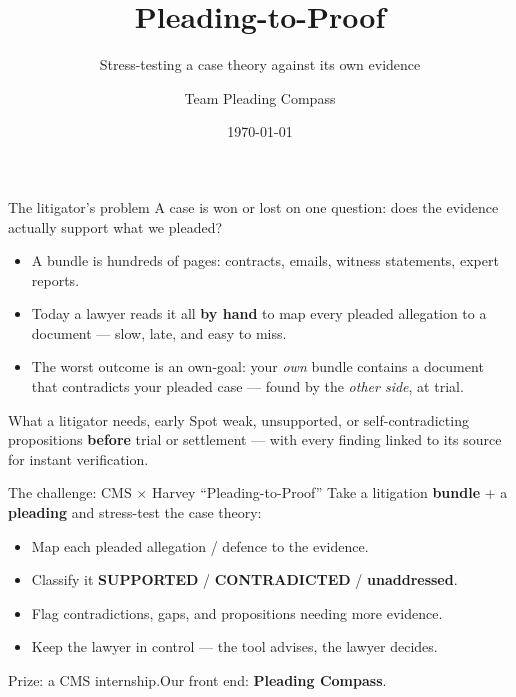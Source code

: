 \documentclass[aspectratio=169,10pt]{beamer}
\title{Pleading-to-Proof}
\subtitle{Stress-testing a case theory against its own evidence}
\author{Team Pleading Compass}
\institute{HackTheLaw 2026 \quad$\cdot$\quad CMS $\times$ Harvey Challenge}
\date{\today}
\newcommand{\supported}{\textcolor{goodgreen}{\textbf{SUPPORTED}}}
\newcommand{\contradicted}{\textcolor{badred}{\textbf{CONTRADICTED}}}
\begin{document}
\maketitle

\begin{frame}{The litigator's problem}
  A case is won or lost on one question: \alert{does the evidence actually
  support what we pleaded?}
  \medskip
  \begin{itemize}
    \item A bundle is hundreds of pages: contracts, emails, witness
          statements, expert reports.
    \item Today a lawyer reads it all \textbf{by hand} to map every pleaded
          allegation to a document --- slow, late, and easy to miss.
    \item The worst outcome is an \alert{own-goal}: your \emph{own} bundle
          contains a document that contradicts your pleaded case --- found by
          the \emph{other side}, at trial.
  \end{itemize}
  \medskip
  \begin{block}{What a litigator needs, early}
    Spot weak, unsupported, or self-contradicting propositions \textbf{before}
    trial or settlement --- with every finding linked to its source for instant
    verification.
  \end{block}
\end{frame}

\begin{frame}{The challenge: CMS $\times$ Harvey ``Pleading-to-Proof''}
  Take a litigation \textbf{bundle} + a \textbf{pleading} and stress-test the
  case theory:
  \begin{itemize}
    \item Map each pleaded allegation / defence to the evidence.
    \item Classify it \supported{} / \contradicted{} / \textbf{unaddressed}.
    \item Flag contradictions, gaps, and propositions needing more evidence.
    \item \alert{Keep the lawyer in control} --- the tool advises, the lawyer
          decides.
  \end{itemize}
  \vfill
  \begin{center}
    \footnotesize Prize: a CMS internship.\quad Our front end: \textbf{Pleading Compass}.
  \end{center}
\end{frame}
\end{document}
